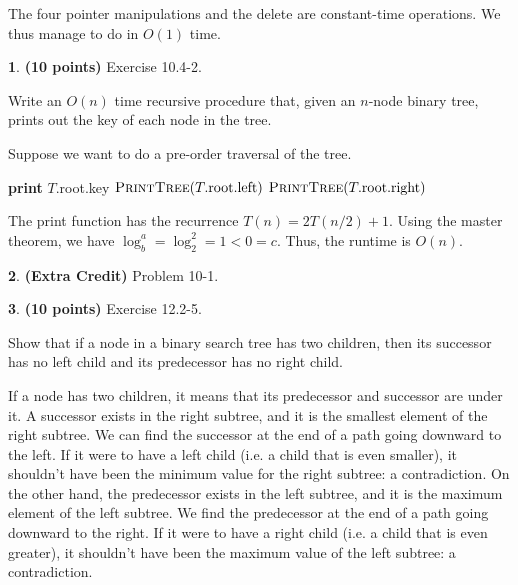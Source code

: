 \documentclass[11pt]{article}
\theoremstyle{definition}
\theoremstyle{theorem}
\newtheorem{prob}{}
\newcommand{\solution}{\medskip\noindent{\color{DarkBlue}\textbf{Solution:}}}
\begin{document}
The four pointer manipulations and the delete are constant-time operations. We thus manage to do  in $O(1)$ time.


\newpage
\begin{prob} \textbf{(10 points)} Exercise 10.4-2.
\end{prob}
Write an $O(n)$ time recursive procedure that, given an $n$-node binary tree, prints out the key of each node in the tree.

\solution

 Suppose we want to do a pre-order traversal of the tree.

\begin{algorithmic}[1]
		\State \textbf{print } $T$.root.key
		\State $\textproc{\textsc{PrintTree}}(T.\text{root.left})$
		\State $\textproc{\textsc{PrintTree}}(T.\text{root.right})$
	\EndIf
\EndFunction
\end{algorithmic}

The print function has the recurrence $T(n) = 2T(n/2) + 1$. Using the master theorem, we have $\log_b^a = \log_2^2 = 1 < 0 = c$. Thus, the runtime is $O(n)$.


\newpage
\begin{prob} \textbf{(Extra Credit)} Problem 10-1.
\end{prob}


\newpage
\begin{prob} \textbf{(10 points)} Exercise 12.2-5.
\end{prob}
Show that if a node in a binary search tree has two children, then its successor has no left child and its predecessor has no right child.

\solution

If a node has two children, it means that its predecessor and successor are under it. A successor exists in the right subtree, and it is the smallest element of the right subtree. We can find the successor at the end of a path going downward to the left. If it were to have a left child (i.e. a child that is even smaller), it shouldn't have been the minimum value for the right subtree: a contradiction. On the other hand, the predecessor exists in the left subtree, and it is the maximum element of the left subtree. We find the predecessor at the end of a path going downward to the right. If it were to have a right child (i.e. a child that is even greater), it shouldn't have been the maximum value of the left subtree: a contradiction. 
\end{document}
